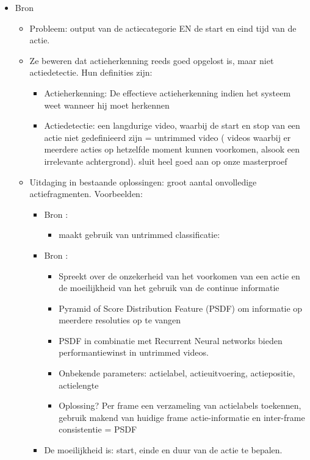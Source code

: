 \begin{itemize}
	\item Bron \cite{Temporal-Action-Detection-with-Structured-Segment-Networks}
	\begin{itemize}
		\item Probleem: output van de actiecategorie EN de start en eind tijd van de actie. 
		\item Ze beweren dat actieherkenning reeds goed opgelost is, maar niet actiedetectie. Hun definities zijn:
		\begin{itemize}
			\item Actieherkenning: De effectieve actieherkenning indien het systeem weet wanneer hij moet herkennen
			\item Actiedetectie: een langdurige video, waarbij de start en stop van een actie niet gedefinieerd zijn = untrimmed video ( videos waarbij er meerdere acties op hetzelfde moment kunnen voorkomen, alsook een irrelevante achtergrond). {\color{green} sluit heel goed aan op onze masterproef}
		\end{itemize}
		\item Uitdaging in bestaande oplossingen: groot aantal onvolledige actiefragmenten. Voorbeelden:
		\begin{itemize}
			\item Bron \cite{singh2016untrimmed}:
			\begin{itemize}
				\item maakt gebruik van untrimmed classificatie: 
			\end{itemize}
				\item Bron \cite{Temporal-Action-Localization-with-Pyramid-of-Score-Distribution-Features}:
			\begin{itemize}
				\item Spreekt over de onzekerheid van het voorkomen van een actie en de moeilijkheid van het gebruik van de continue informatie

				\item Pyramid of Score Distribution Feature (PSDF) om informatie op meerdere resoluties op te vangen
				\item PSDF in combinatie met Recurrent Neural networks bieden performantiewinst in untrimmed videos.
				\item Onbekende parameters: actielabel, actieuitvoering, actiepositie, actielengte
				\item Oplossing? Per frame een verzameling van actielabels toekennen, gebruik makend van huidige frame actie-informatie en inter-frame consistentie = PSDF
	
			\end{itemize}
		\item De moeilijkheid is: start, einde en duur van de actie te bepalen.
		\end{itemize}
		
	\end{itemize}



\end{itemize}